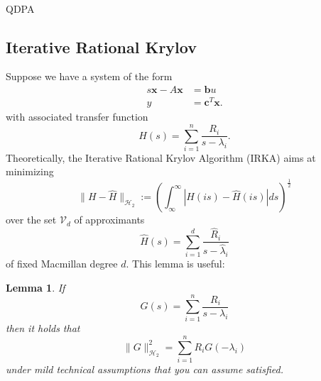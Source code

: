 \documentclass{article}
\newtheorem{lemma}{Lemma}
\begin{document}
	\begin{algorithm2e}[ht]
		\SetAlgoLined
		\\
		\caption{QDPA}
		\label{alg:QDPA}
	\end{algorithm2e}
	
	
	\subsection{Iterative Rational Krylov}
	Suppose we have a system of the form
	\begin{equation}\label{eq:stateSpace}
		\begin{aligned}
			s\mathbf{x}-A\mathbf{x}&=\mathbf{b}u\\
			y&=\mathbf{c}^T\mathbf{x}.
		\end{aligned} 
	\end{equation}
	with associated transfer function
	$$H(s)=\sum_{i=1}^n\frac{R_i}{s-\lambda_i}.$$
	Theoretically, the Iterative Rational Krylov Algorithm (IRKA) aims at minimizing
	$$\|H-\hat{H}\|_{\mathcal{H}_2}:=\left(\int_{\infty}^{\infty}|H(is)-\hat{H}(is)|ds\right)^{\frac{1}{2}}$$
	over the set $\mathcal{V}_d$ of approximants
	$$\hat{H}(s)=\sum_{i=1}^d\frac{\hat{R}_i}{s-\hat{\lambda}_i}$$
	of fixed Macmillan degree $d$.
	This lemma is useful:
	\begin{lemma}\label{lem:H2opt-G}
		If
		$$G(s)=\sum_{i=1}^{n}\frac{R_i}{s-\lambda_i}$$
		then it holds that
		$$\|G\|_{\mathcal{H}_2}^2=\sum_{i=1}^{n}R_iG(-\lambda_i)$$
		under mild technical assumptions that you can assume satisfied.
	\end{lemma}
	
\end{document}
